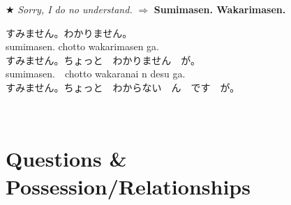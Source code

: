 \documentclass[11pt]{article} %
\begin{document}
$\bigstar$ \textit{Sorry, I do no understand.} $\Rightarrow$ \textbf{Sumimasen. Wakarimasen.}\\
\begin{CJK}{UTF8}{min}すみません。わかりません。\\
sumimasen. chotto wakarimasen ga.\\
すみません。ちょっと　わかりません　が。\\
sumimasen.　chotto wakaranai n desu ga.\\
すみません。ちょっと　わからない　ん　です　が。 \end{CJK}\\

\section{Questions \& Possession/Relationships}
\end{document}
